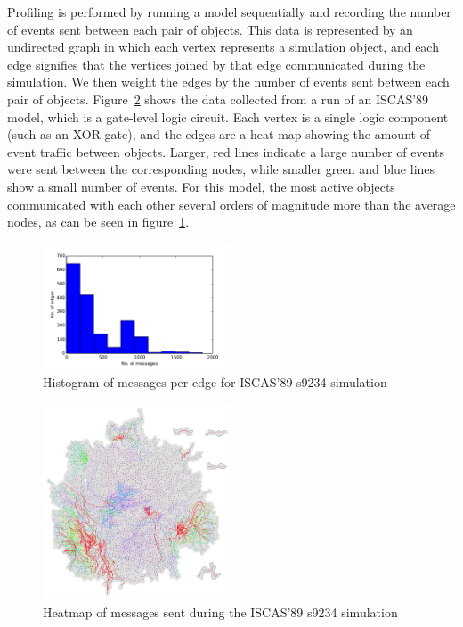 \documentclass{wscpaperproc}
\begin{document}
Profiling is performed by running a model sequentially and recording the number of events sent between each pair of objects. This data is represented by an undirected graph in which each vertex represents a simulation object, and each edge signifies that the vertices joined by that edge communicated during the simulation. We then weight the edges by the number of events sent between each pair of objects. Figure~\ref{fig:iscasUnpart} shows the data collected from a run of an ISCAS’89 model, which is a gate-level logic circuit. Each vertex is a single logic component (such as an XOR gate), and the edges are a heat map showing the amount of event traffic between objects. Larger, red lines indicate a large number of events were sent between the corresponding nodes, while smaller green and blue lines show a small number of events. For this model, the most active objects communicated with each other several orders of magnitude more than the average nodes, as can be seen in figure~\ref{fig:s9234_histo}.

\begin{figure}[h]
\centering
\includegraphics[clip=true,width=0.5\textwidth]{s9234_histo}
\caption{Histogram of messages per edge for ISCAS'89 s9234 simulation}
\label{fig:s9234_histo}
\end{figure}

\begin{figure}[h]
\centering
\includegraphics[clip=true,width=0.5\textwidth]{s9234_1part}
\caption{Heatmap of messages sent during the ISCAS'89 s9234 simulation}
\label{fig:iscasUnpart}
\end{figure}
\end{document}
